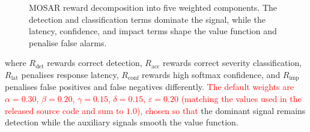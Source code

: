 \documentclass[journal]{IEEEtran}
\newcommand{\rev}[1]{\textcolor{red}{#1}}
\begin{document}
\begin{figure}[!htbp]
  \centering
  \caption{MOSAR reward decomposition into five weighted components.
  The detection and classification terms dominate the signal, while the
  latency, confidence, and impact terms shape the value function and
  penalise false alarms.}
  \label{fig:mosar_schema}
\end{figure}

where $R_{\text{det}}$ rewards correct detection, $R_{\text{acc}}$
rewards correct severity classification, $R_{\text{lat}}$ penalises
response latency, $R_{\text{conf}}$ rewards high softmax confidence, and
$R_{\text{imp}}$ penalises false positives and false negatives
differently. \rev{The default weights are $\alpha = 0.30$, $\beta = 0.20$,
$\gamma = 0.15$, $\delta = 0.15$, $\varepsilon = 0.20$ (matching the values used in the released source code and sum to $1.0$), chosen so that}
the dominant signal remains detection while the auxiliary signals smooth
the value function.
\end{document}

